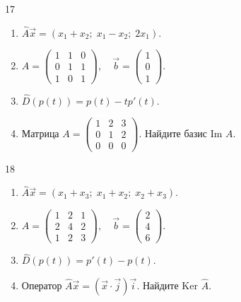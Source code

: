\documentclass[12pt,a4paper]{article}
\theoremstyle{plain}
\theoremstyle{definition}
\begin{document}
\begin{taskbox}{17}
    \begin{enumerate}
        \item $\hat{A}\vec{x} = (x_1 + x_2; \; x_1 - x_2; \; 2x_1)$.
        \item $A = \begin{pmatrix} 1 & 1 & 0 \\ 0 & 1 & 1 \\ 1 & 0 & 1 \end{pmatrix}, \quad \vec{b} = \begin{pmatrix} 1 \\ 0 \\ 1 \end{pmatrix}$.
        \item $\hat{D}(p(t)) = p(t) - t p'(t)$.
        \item Матрица $A = \begin{pmatrix} 1 & 2 & 3 \\ 0 & 1 & 2 \\ 0 & 0 & 0 \end{pmatrix}$. Найдите базис $\text{Im } A$.
    \end{enumerate}
\end{taskbox}

\begin{taskbox}{18}
    \begin{enumerate}
        \item $\hat{A}\vec{x} = (x_1 + x_3; \; x_1 + x_2; \; x_2 + x_3)$.
        \item $A = \begin{pmatrix} 1 & 2 & 1 \\ 2 & 4 & 2 \\ 1 & 2 & 3 \end{pmatrix}, \quad \vec{b} = \begin{pmatrix} 2 \\ 4 \\ 6 \end{pmatrix}$.
        \item $\hat{D}(p(t)) = p'(t) - p(t)$.
        \item Оператор $\hat{A}\vec{x} = (\vec{x} \cdot \vec{j})\vec{i}$. Найдите $\text{Ker } \hat{A}$.
    \end{enumerate}
\end{taskbox}
\end{document}
